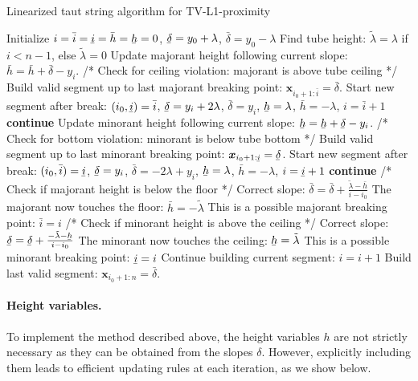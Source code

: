 \documentclass[twoside,11pt]{article}
\newcommand{\vx}{\bm{x}}       \newcommand{\vxh}{\hat{\bm{x}}}        \newcommand{\xh}{\hat{x}}    \newcommand{\vxt}{\tilde{\bm{x}}}       \newcommand{\xt}{\tilde{x}}
\newcommand{\ubar}[1]{\underaccent{\bar}{#1}}
\numberwithin{equation}{section}
\numberwithin{theorem}{section}
\begin{document}
\begin{algorithm}[t]\small
 \caption{\small Linearized taut string algorithm for TV-L1-proximity}
 \label{algTV1tautString}
 \begin{algorithmic}[1]
   \State Initialize $i = \bar i = \ubar i = \bar h = \ubar h = 0$, $\ubar \delta = y_0 + \lambda$, $\bar \delta = y_0 - \lambda$
   \State Find tube height: $\tilde \lambda = \lambda$ if $i < n-1$, else $\tilde \lambda = 0$
   \State Update majorant height following current slope: $\bar h = \bar h + \bar \delta - y_i$.
   \State /* Check for ceiling violation: majorant is above tube ceiling */
     \State Build valid segment up to last majorant breaking point: $\vx_{i_0+1:\bar i} = \bar \delta$.
     \State Start new segment after break: $(i_0, \ubar i) = \bar i$, $\ubar \delta = y_i + 2\lambda$, $\bar \delta = y_i$, $\ubar h = \lambda$, $\bar h = -\lambda$, $i = \bar i+1$
     \State \textbf{continue}
   \EndIf
   \State Update minorant height following current slope: $\ubar h = \ubar h + \ubar \delta - y_i$.
   \State /* Check for bottom violation: minorant is below tube bottom */
   \If { $\ubar h < -\tilde \lambda$}
     \State Build valid segment up to last minorant breaking point: $\vx_{i_0+1:\ubar i} = \ubar \delta$.
     \State Start new segment after break: $(i_0, \bar i) = \ubar i$, $\ubar \delta = y_i$, $\bar \delta = -2\lambda + y_i$, $\ubar h = \lambda$, $\bar h = -\lambda$, $i = \ubar i + 1$
     \State \textbf{continue}
   \EndIf
   \State /* Check if majorant height is below the floor */
     \State Correct slope: $\bar \delta = \bar \delta + \frac{\tilde \lambda - \bar h}{i - i_0}$
     \State The majorant now touches the floor: $\bar h = -\tilde \lambda$
     \State This is a possible majorant breaking point: $\bar i = i$
   \EndIf
   \State /* Check if minorant height is above the ceiling */
   \If { $\ubar h \geq \tilde \lambda$ }
     \State Correct slope: $\ubar \delta = \ubar \delta + \frac{-\tilde\lambda - \ubar h}{i - i_0}$
     \State The minorant now touches the ceiling: $\ubar h = \tilde \lambda$
     \State This is a possible minorant breaking point: $\ubar i = i$
   \EndIf
   \State Continue building current segment: $i = i+1$
  \EndWhile
  \State Build last valid segment: $\vx_{i_0+1:n} = \bar \delta$.
 \end{algorithmic}
\end{algorithm}


\paragraph{Height variables.} To implement the method described above, the height variables $h$ are not strictly necessary as they can be obtained from the slopes $\delta$. However, explicitly including them leads to efficient updating rules at each iteration, as we show below.
\end{document}
